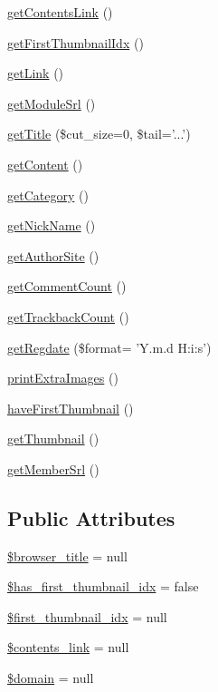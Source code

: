 \begin{DoxyCompactItemize}
\hyperlink{classmcontentItem_a60fe1f5cbd47314c2910a8782a3252a9}{get\-Contents\-Link} ()
\item 
\hyperlink{classmcontentItem_acb7e5ab4fbeac716585618eba64960aa}{get\-First\-Thumbnail\-Idx} ()
\item 
\hyperlink{classmcontentItem_a5a2cad58644aabb016942e427998f32c}{get\-Link} ()
\item 
\hyperlink{classmcontentItem_a9b9841e39ff3ee331679270f9e075203}{get\-Module\-Srl} ()
\item 
\hyperlink{classmcontentItem_a180633138fb77537e7da900074aa7454}{get\-Title} (\$cut\-\_\-size=0, \$tail='...')
\item 
\hyperlink{classmcontentItem_a19b333e6ff14db6f7f77c3f94471bdff}{get\-Content} ()
\item 
\hyperlink{classmcontentItem_ae8d1d6e76cc1cfa79d544d47acaedbcc}{get\-Category} ()
\item 
\hyperlink{classmcontentItem_a8182db3f99934760d5f52082b233a1cb}{get\-Nick\-Name} ()
\item 
\hyperlink{classmcontentItem_a90fc323e4d3cf2661e6af5e51babd05f}{get\-Author\-Site} ()
\item 
\hyperlink{classmcontentItem_ac60221ec5be0a8158c5248c09efd8fb1}{get\-Comment\-Count} ()
\item 
\hyperlink{classmcontentItem_afb955c421fa34f36c51edd795d3a00c7}{get\-Trackback\-Count} ()
\item 
\hyperlink{classmcontentItem_a9f7a6c2fc454c1d7e7524504141f3fc1}{get\-Regdate} (\$format= 'Y.\-m.\-d H\-:i\-:s')
\item 
\hyperlink{classmcontentItem_a0cd7ac4bbaf7e7561f5597920c691f9d}{print\-Extra\-Images} ()
\item 
\hyperlink{classmcontentItem_ac8b5fb3d84cdc8a96a8c02e9472e25dd}{have\-First\-Thumbnail} ()
\item 
\hyperlink{classmcontentItem_a25e5c63dceabc33afe0b5ce5b3ddafcf}{get\-Thumbnail} ()
\item 
\hyperlink{classmcontentItem_ab7ad6741a93ab7d631f78bf1253f6800}{get\-Member\-Srl} ()
\end{DoxyCompactItemize}
\subsection*{Public Attributes}
\begin{DoxyCompactItemize}
\item 
\hyperlink{classmcontentItem_afdef241bedb2d1829475b7bb623cecf7}{\$browser\-\_\-title} = null
\item 
\hyperlink{classmcontentItem_a8c95afa6c7bcad64626c9f343e77cdd4}{\$has\-\_\-first\-\_\-thumbnail\-\_\-idx} = false
\item 
\hyperlink{classmcontentItem_a358e826e3ee863300d43b12a8218a5fa}{\$first\-\_\-thumbnail\-\_\-idx} = null
\item 
\hyperlink{classmcontentItem_afdee32faf59897fa7e02f9ed4389b411}{\$contents\-\_\-link} = null
\item 
\hyperlink{classmcontentItem_ad92b662d98d23cb2a10747de7ffdada0}{\$domain} = null
\end{DoxyCompactItemize}


